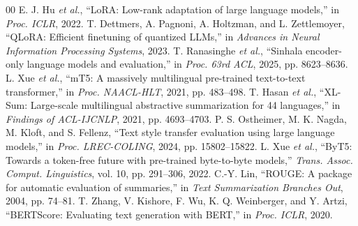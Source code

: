 \documentclass[a4paper,conference]{IEEEtran}
\begin{document}
\begin{thebibliography}{00}
 E. J. Hu \textit{et al.}, ``LoRA: Low-rank adaptation of large language models,'' in \textit{Proc. ICLR}, 2022.
 T. Dettmers, A. Pagnoni, A. Holtzman, and L. Zettlemoyer, ``QLoRA: Efficient finetuning of quantized LLMs,'' in \textit{Advances in Neural Information Processing Systems}, 2023.
 T. Ranasinghe \textit{et al.}, ``Sinhala encoder-only language models and evaluation,'' in \textit{Proc. 63rd ACL}, 2025, pp. 8623--8636.
 L. Xue \textit{et al.}, ``mT5: A massively multilingual pre-trained text-to-text transformer,'' in \textit{Proc. NAACL-HLT}, 2021, pp. 483--498.
 T. Hasan \textit{et al.}, ``XL-Sum: Large-scale multilingual abstractive summarization for 44 languages,'' in \textit{Findings of ACL-IJCNLP}, 2021, pp. 4693--4703.
 P. S. Ostheimer, M. K. Nagda, M. Kloft, and S. Fellenz, ``Text style transfer evaluation using large language models,'' in \textit{Proc. LREC-COLING}, 2024, pp. 15802--15822.
 L. Xue \textit{et al.}, ``ByT5: Towards a token-free future with pre-trained byte-to-byte models,'' \textit{Trans. Assoc. Comput. Linguistics}, vol. 10, pp. 291--306, 2022.
 C.-Y. Lin, ``ROUGE: A package for automatic evaluation of summaries,'' in \textit{Text Summarization Branches Out}, 2004, pp. 74--81.
 T. Zhang, V. Kishore, F. Wu, K. Q. Weinberger, and Y. Artzi, ``BERTScore: Evaluating text generation with BERT,'' in \textit{Proc. ICLR}, 2020.
\end{thebibliography}
\end{document}
